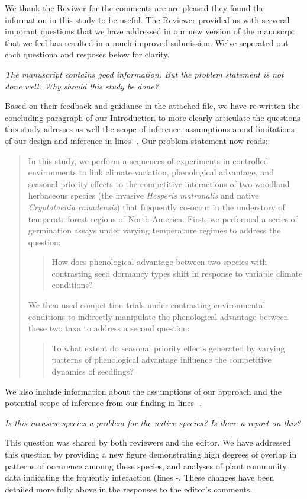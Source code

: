 \documentclass[11pt]{article}
\begin{document}
We thank the Reviwer for the comments are are pleased they found the information in this study to be useful. The Reviewer provided us with serveral imporant questions that we have addressed in our new version of the manuscrpt that we feel has resulted in a much improved submission. We've seperated out each questiona and resposes below for clarity.

\emph{The manuscript contains good information. But the problem statement is not done well. Why should this study be done?} 

Based on their feedback and guidance in the attached file, we have re-written the concluding paragraph of our Introduction to more clearly articulate the questions this study adresses as well the scope of inference, assumptions amnd limitations of our design and inference in lines -. Our problem statement now reads:
\begin{quote}
In this study, we perform a sequences of experiments in controlled environments to link climate variation, phenological advantage, and seasonal priority effects to the competitive interactions of two woodland herbaceous species (the invasive \textit{Hesperis matronalis} and native \textit{Cryptotaenia canadensis}) that frequently co-occur in the understory of temperate forest regions of North America. First, we performed a series of germination assays under varying temperature regimes to address the question: 
\begin{quote}How does phenological advantage between two species with contrasting seed dormancy types shift in response to variable climate conditions?\end{quote}
We then used competition trials under contrasting environmental conditions to indirectly manipulate the phenological advantage between these two taxa to address a second question: \begin{quote}To what extent do seasonal priority effects generated by varying patterns of phenological advantage influence the competitive dynamics of seedlings?\end{quote}
\end{quote}

We also include information about the assumptions of our approach and the potential scope of inference from our finding in lines -. 

\emph{Is this invasive species a problem for the native species? Is there a report on this?}

This question was shared by both reviewers and the editor. We have addressed this question by providing a new figure demonstrating high degrees of overlap in patterns of occurence amoung these species, and analyses of plant community data indicating the frquently interaction (lines -. These changes have been detailed more fully above in the responses to the editor's comments.
\end{document}
